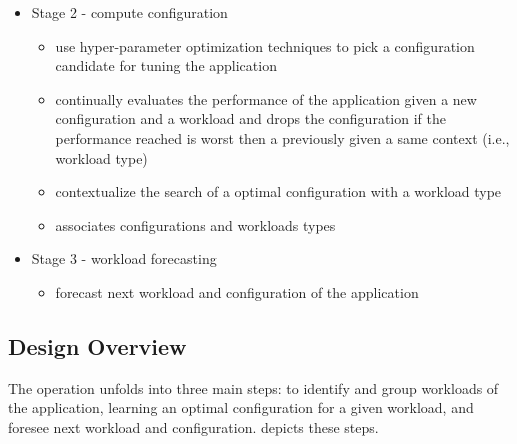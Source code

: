 \begin{itemize}
\begin{itemize}
     \end{itemize}

   \item Stage 2 - compute configuration

      \begin{itemize}

        \item use hyper-parameter optimization techniques to pick a
          configuration candidate for tuning the application

        \item continually evaluates the performance of the application given a
          new configuration and a workload and drops the configuration if the
          performance reached is worst then a previously given a same context
          (i.e., workload type)

        \item contextualize the search of a optimal configuration with a
          workload type

        \item associates configurations and workloads types

      \end{itemize}

   \item Stage 3 - workload forecasting

      \begin{itemize}

        \item forecast next workload and configuration of the application

      \end{itemize}
 \end{itemize}

\subsection{Design Overview}


The \name operation unfolds into three main steps: to identify and group
workloads of the application, learning an optimal configuration for a given
workload, and foresee next workload and configuration. 
depicts these steps.

